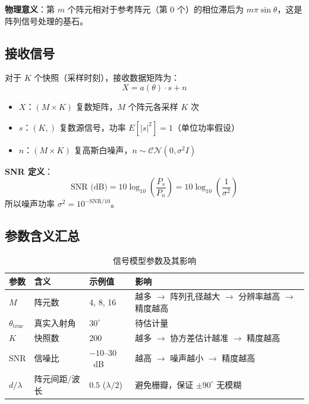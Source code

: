 \documentclass[11pt,a4paper]{article}
\begin{document}
\textbf{物理意义}：第 $m$ 个阵元相对于参考阵元（第 0 个）的相位滞后为 $m\pi\sin\theta$，这是阵列信号处理的基石。

\subsection{接收信号}

对于 $K$ 个快照（采样时刻），接收数据矩阵为：
\begin{equation}
X = a(\theta) \cdot s + n
\end{equation}

\begin{itemize}
    \item $X$：$(M \times K)$ 复数矩阵，$M$ 个阵元各采样 $K$ 次
    \item $s$：$(K,)$ 复数源信号，功率 $E[|s|^2] = 1$（单位功率假设）
    \item $n$：$(M \times K)$ 复高斯白噪声，$n \sim \mathcal{CN}(0, \sigma^2 I)$
\end{itemize}

\textbf{SNR 定义}：
\begin{equation}
\text{SNR (dB)} = 10 \log_{10}\left(\frac{P_s}{P_n}\right)
                = 10 \log_{10}\left(\frac{1}{\sigma^2}\right)
\end{equation}
所以噪声功率 $\sigma^2 = 10^{-\text{SNR}/10}$。

\subsection{参数含义汇总}

\begin{table}[H]
\centering
\caption{信号模型参数及其影响}
\label{tab:params}
\begin{tabular}{llll}
\toprule
\textbf{参数} & \textbf{含义} & \textbf{示例值} & \textbf{影响} \\
\midrule
$M$ & 阵元数 & 4, 8, 16 & 越多 $\to$ 阵列孔径越大 $\to$ 分辨率越高 $\to$ 精度越高 \\
$\theta_{\text{true}}$ & 真实入射角 & $30^\circ$ & 待估计量 \\
$K$ & 快照数 & 200 & 越多 $\to$ 协方差估计越准 $\to$ 精度越高 \\
SNR & 信噪比 & $-10$--$30$~dB & 越高 $\to$ 噪声越小 $\to$ 精度越高 \\
$d/\lambda$ & 阵元间距/波长 & $0.5$ ($\lambda/2$) & 避免栅瓣，保证 $\pm 90^\circ$ 无模糊 \\
\bottomrule
\end{tabular}
\end{table}
\end{document}
